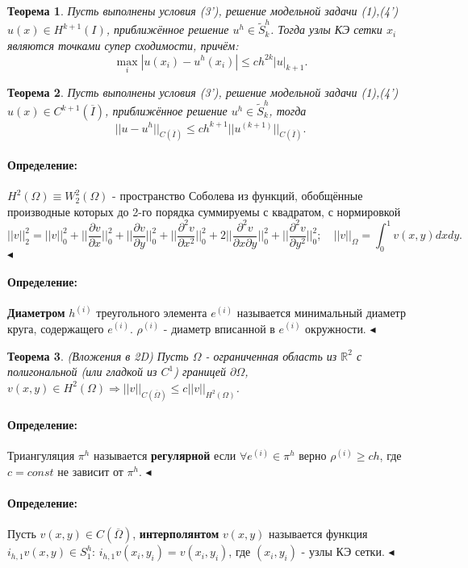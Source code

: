 \documentclass{article}
\newtheorem{theorem}{Теорема}
\newenvironment{definition}{ \paragraph{Определение:}}{\hfill $\blacktriangleleft$}
\begin{document}
\begin{theorem}
	Пусть выполнены условия (3'), решение модельной задачи (1),(4') $u(x) \in H^{k+1} (I)$, приближённое решение $u^h \in \tilde{S}_k^h$. Тогда узлы КЭ сетки $x_i$ являются точками супер сходимости, причём:
	\[
	\max\limits_{i} |u(x_i) - u^h(x_i)| \leqslant c h^{2k} |u|_{k+1}.	
	\]
\end{theorem}

\begin{theorem}
	Пусть выполнены условия (3'), решение модельной задачи (1),(4') $u(x) \in C^{k+1} (\overline{I})$, приближённое решение $u^h \in \tilde{S}_k^h$, тогда
	\[
	||u - u^h||_{C (\overline{I})} \leqslant c h^{k + 1} ||u^{(k+1)}||_{C (\overline{I})}.	
	\]
\end{theorem}

\begin{definition}
	$H^2(\Omega) \equiv W_2^2(\Omega)$ - пространство Соболева из функций, обобщённые производные которых до 2-го порядка суммируемы с квадратом, с нормировкой
	\[
	||v||_2^2 = ||v||_0^2 + ||\dfrac{\partial v}{\partial x}||_0^2 + ||\dfrac{\partial v}{\partial y}||_0^2 + 
				||\dfrac{\partial^2 v}{\partial x^2}||_0^2 + 2 ||\dfrac{\partial^2 v}{\partial x \partial y }||_0^2 + ||\dfrac{\partial^2 v}{\partial y^2}||_0^2;
	\quad ||v||_{\Omega} = \int_0^1 v(x,y) dx dy.
	\]
\end{definition}

\begin{definition}
	\textbf{Диаметром} $h^{(i)}$ треугольного элемента $e^{(i)}$ называется минимальный диаметр круга, содержащего $e^{(i)}$. $\rho ^{(i)}$ - диаметр вписанной в $e^{(i)}$ окружности.
\end{definition}

\begin{theorem}
	(Вложения в 2D) Пусть $\Omega$ - ограниченная область из $\mathbb{R}^2$ с полигональной (или гладкой из $C^1$) границей $\partial \Omega$, $v(x,y) \in H^2(\Omega) \Rightarrow ||v||_{C(\overline{\Omega})} \leqslant c ||v||_{H^2(\Omega)}$.
\end{theorem}

\begin{definition}
	Триангуляция $\pi^h$ называется  \textbf{регулярной} если $\forall e^{(i)} \in \pi^h$ верно $\rho ^{(i)} \geqslant ch$, где $c = const$ не зависит от $\pi^h$.
\end{definition}

\begin{definition}
	Пусть $v(x,y) \in C(\overline{\Omega})$, \textbf{интерполянтом} $v(x,y)$ называется функция $i_{h,1} v(x,y) \in S_1^h$: $i_{h,1} v(x_i,y_i) = v(x_i, y_i)$, где $(x_i,y_i)$ - узлы КЭ сетки.
\end{definition}
\end{document}

